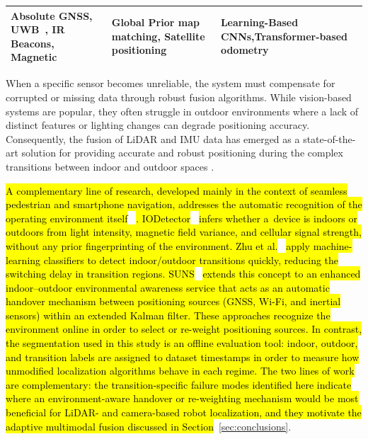 \documentclass[pdflatex,sn-mathphys-num]{sn-jnl}
\theoremstyle{thmstyleone}%
\theoremstyle{thmstyletwo}%
\theoremstyle{thmstylethree}%
\begin{document}
\begin{table}[h]
\begin{tabular}{p{4cm} p{4cm} p{4cm}}
        \textbf{Absolute} \newline \newline \footnotesize{GNSS, UWB~\cite{UWB-OptiTrack}, \newline IR Beacons, \newline Magnetic \cite{magnetic_localzation}}
        & 
        \textbf{Global} \newline \newline \footnotesize{Prior map matching, \newline Satellite positioning}
        & 
        \textbf{Learning-Based} \newline \newline \footnotesize{CNNs,\newline Transformer-based odometry} \\
        
        \bottomrule
        \bottomrule
    \end{tabular}
\end{table}

When a specific sensor becomes unreliable, the system must compensate for corrupted or missing data through robust fusion algorithms. While vision-based systems are popular, they often struggle in outdoor environments where a lack of distinct features or lighting changes can degrade positioning accuracy. Consequently, the fusion of LiDAR and IMU data has emerged as a state-of-the-art solution for providing accurate and robust positioning during the complex transitions between indoor and outdoor spaces \cite{FAST-LIO2, shan2020liosam, nubert2021self}.

\hl{A complementary line of research, developed mainly in the context of seamless pedestrian and smartphone navigation, addresses the automatic recognition of the operating environment itself}~\cite{feriol2020review} \hl{. IODetector}~\cite{zhou2012iodetector} \hl{infers whether a~device is indoors or outdoors from light intensity, magnetic field variance, and cellular signal strength, without any prior fingerprinting of the environment. Zhu et al.}~\cite{zhu2019fastio} \hl{apply machine-learning classifiers to detect indoor/outdoor transitions quickly, reducing the switching delay in transition regions. SUNS}~\cite{mansour2022suns} \hl{extends this concept to an enhanced indoor--outdoor environmental awareness service that acts as an automatic handover mechanism between positioning sources (GNSS, Wi-Fi, and inertial sensors) within an extended Kalman filter. These approaches recognize the environment online in order to select or re-weight positioning sources. In contrast, the segmentation used in this study is an offline evaluation tool: indoor, outdoor, and transition labels are assigned to dataset timestamps in order to measure how unmodified localization algorithms behave in each regime. The two lines of work are complementary: the transition-specific failure modes identified here indicate where an environment-aware handover or re-weighting mechanism would be most beneficial for LiDAR- and camera-based robot localization, and they motivate the adaptive multimodal fusion discussed in Section}~\ref{sec:conclusions}.
\end{document}
